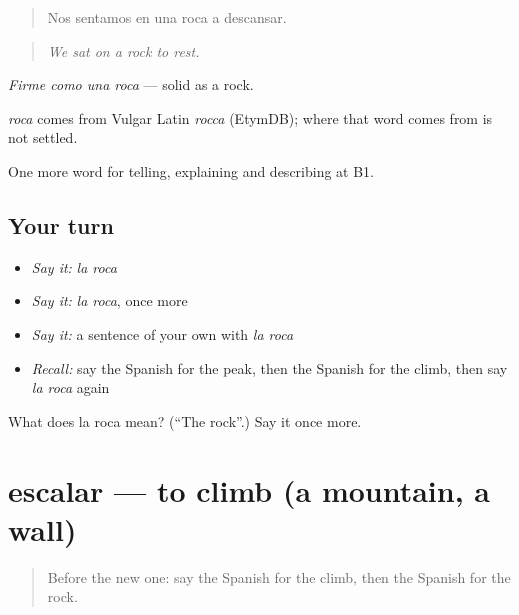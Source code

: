 \begin{quote}
Nos sentamos en una roca a descansar.
\end{quote}

\begin{quote}
\emph{We sat on a rock to rest.}
\end{quote}

\emph{Firme como una roca} — solid as a rock.

\begin{cousinweb}
\emph{roca} comes from Vulgar Latin \emph{rocca} (EtymDB); where that word comes from is not settled.
\end{cousinweb}

\begin{grammarlens}[title={What you've built}]
One more word for telling, explaining and describing at B1.
\end{grammarlens}

\subsection*{Your turn}
\begin{itemize}
\raggedright
  \item \emph{Say it:} \emph{la roca}
  \item \emph{Say it:} \emph{la roca}, once more
  \item \emph{Say it:} a sentence of your own with \emph{la roca}
  \item \emph{Recall:} say the Spanish for the peak, then the Spanish for the climb, then say \emph{la roca} again
\end{itemize}

\begin{tcolorbox}[breakable,colback=teal!4,colframe=teal!35!black,title={Before you move on}]
What does la roca mean? (\textquotedblleft{}The rock\textquotedblright{}.) Say it once more.
\end{tcolorbox}
\section[escalar]{escalar — to climb (a mountain, a wall)}

\label{lesson:ES-C686-escalar}



\begin{quote}
Before the new one: say the Spanish for the climb, then the Spanish for the rock.
\end{quote}

